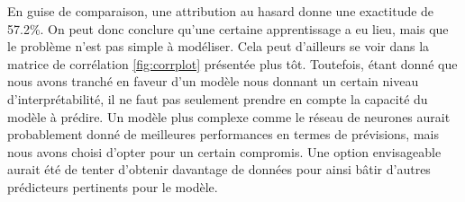 En guise de comparaison, une attribution au hasard donne une exactitude de 57.2\%. On peut donc conclure qu'une certaine apprentissage a eu lieu, mais que le problème n'est pas simple à modéliser. Cela peut d'ailleurs se voir dans la matrice de corrélation \ref{fig:corrplot} présentée plus tôt. Toutefois, étant donné que nous avons tranché en faveur d'un modèle nous donnant un certain niveau d'interprétabilité, il ne faut pas seulement prendre en compte la capacité du modèle à prédire. Un modèle plus complexe comme le réseau de neurones aurait probablement donné de meilleures performances en termes de prévisions, mais nous avons choisi d'opter pour un certain compromis. Une option envisageable aurait été de tenter d'obtenir davantage de données pour ainsi bâtir d'autres prédicteurs pertinents pour le modèle.